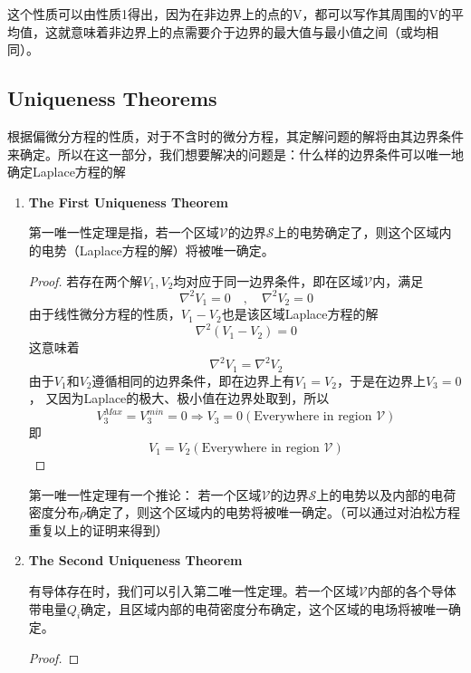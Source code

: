 \documentclass[14pt,oneside]{book}
\begin{document}
\begin{large}
\begin{enumerate}
这个性质可以由性质1得出，因为在非边界上的点的V，都可以写作其周围的V的平均值，这就意味着非边界上的点需要介于边界的最大值与最小值之间（或均相同）。
\end{enumerate}

\subsection{Uniqueness Theorems}
根据偏微分方程的性质，对于不含时的微分方程，其定解问题的解将由其边界条件来确定。所以在这一部分，我们想要解决的问题是：什么样的边界条件可以唯一地确定Laplace方程的解
\begin{enumerate}
  \item{\textbf{The First Uniqueness Theorem}}
  
  \qquad 第一唯一性定理是指，若一个区域$\mathcal{V}$的边界$\mathcal{S}$上的电势确定了，则这个区域内的电势（Laplace方程的解）将被唯一确定。
  \begin{proof}
  	若存在两个解$V_1,V_2$均对应于同一边界条件，即在区域$\mathcal{V}$内，满足
  	\begin{equation}
  \nabla^2 V_1=0\quad,\quad \nabla^2 V_2 =0
	\end{equation}
由于线性微分方程的性质，$V_1-V_2$也是该区域Laplace方程的解
\begin{equation}
  \nabla^2( V_1-V_2)=0
\end{equation}
这意味着
\begin{equation}
  \nabla^2 V_1=\nabla^2 V_2
\end{equation}
由于$V_1$和$V_2$遵循相同的边界条件，即在边界上有$V_1=V_2$，于是在边界上$V_3=0$，
又因为Laplace的极大、极小值在边界处取到，所以
\begin{equation}
  {V_3^{Max}}={V_3^{min}}=0\Rightarrow V_3=0(\text{Everywhere in region $\mathcal{V}$})
\end{equation}
即
\begin{equation}
  V_1=V_2(\text{Everywhere in region $\mathcal{V}$})
\end{equation}
  \end{proof}
 \qquad 第一唯一性定理有一个推论：
  若一个区域$\mathcal{V}$的边界$\mathcal{S}$上的电势以及内部的电荷密度分布$\rho$确定了，则这个区域内的电势将被唯一确定。（可以通过对泊松方程重复以上的证明来得到）




\item{\textbf{The Second Uniqueness Theorem}} 

\qquad 有导体存在时，我们可以引入第二唯一性定理。若一个区域$\mathcal{V}$内部的各个导体带电量$Q_i$确定，且区域内部的电荷密度分布确定，这个区域的电场将被唯一确定。
\begin{proof}
	

\end{proof}
\end{enumerate}
\end{large}
\end{document}

